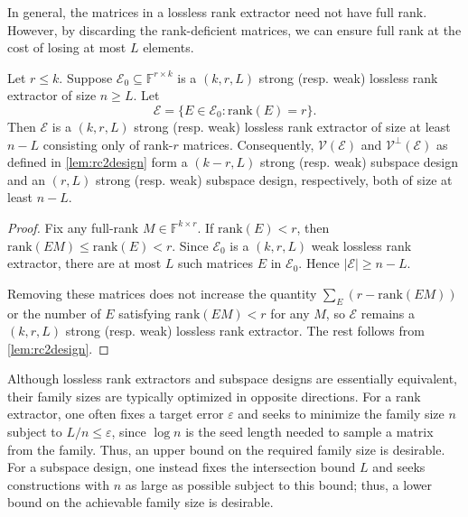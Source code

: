 \documentclass[11pt]{article}
\newcommand{\eps}{\varepsilon}
\newcommand{\rank}{\mathrm{rank}}
\newcommand{\F}{\mathbb{F}}
\begin{document}
In general, the matrices in a lossless rank extractor need not have full rank.
However, by discarding the rank-deficient matrices, we can ensure full rank at the cost
of losing at most $L$ elements.

\begin{lemma}\label{lem:reduced}
Let $r\le k$. Suppose $\mathcal{E}_0\subseteq \F^{r\times k}$ is a $(k,r,L)$ strong (resp. weak) lossless
rank extractor of size $n\ge L$. Let
\[
\mathcal{E}=\{E\in\mathcal{E}_0 : \rank(E)=r\}.
\]
Then $\mathcal{E}$ is a $(k,r,L)$ strong (resp. weak) lossless rank extractor of size at least $n-L$
consisting only of rank-$r$ matrices. Consequently, $\mathcal{V}(\mathcal{E})$ and $\mathcal{V}^\perp(\mathcal{E})$ as defined in \cref{lem:rc2design} form a $(k-r,L)$ strong (resp. weak) subspace design and an $(r,L)$ strong (resp. weak) subspace design, respectively, both of size at least $n-L$.
\end{lemma}

\begin{proof}
Fix any full-rank $M\in\F^{k\times r}$. If $\rank(E)<r$, then $\rank(EM)\le \rank(E)<r$.
Since $\mathcal{E}_0$ is a $(k,r,L)$ weak lossless rank extractor, there are at most $L$ such matrices $E$ in $\mathcal{E}_0$. Hence $|\mathcal{E}|\ge n-L$.

Removing these matrices does not increase the quantity $\sum_{E}(r-\rank(EM))$ or the number of $E$ satisfying $\rank(EM)<r$ for any $M$,
so $\mathcal{E}$ remains a $(k,r,L)$ strong (resp. weak) lossless rank extractor.
The rest follows from \cref{lem:rc2design}.
\end{proof}

\begin{remark}
Although lossless rank extractors and subspace designs are essentially equivalent, their family sizes are typically optimized in opposite directions. For a rank extractor, one often fixes a target error $\eps$ and seeks to minimize the family size $n$ subject to $L/n \leq \eps$, since $\log n$ is the seed length needed to sample a matrix from the family. Thus, an upper bound on the required family size is desirable. For a subspace design, one instead fixes the intersection bound $L$ and seeks constructions with $n$ as large as possible subject to this bound; thus, a lower bound on the achievable family size is desirable.
\end{remark}



\end{document}
